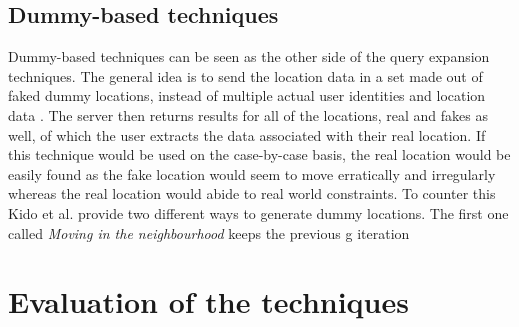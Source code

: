 \documentclass[english]{tktltiki2}
\theoremstyle{definition}
\theoremstyle{remark}
\begin{document}
\subsection{Dummy-based techniques}

Dummy-based techniques can be seen as the other side of the query expansion techniques. The general idea is to send the location data in a set made out of faked dummy locations, instead of multiple actual user identities and location data \cite{Kido2005}. The server then returns results for all of the locations, real and fakes as well, of which the user extracts the data associated with their real location. If this technique would be used on the case-by-case basis, the real location would be easily found as the fake location would seem to move erratically and irregularly whereas the real location would abide to real world constraints. To counter this Kido et al. provide two different ways to generate dummy locations. The first one called \textit{Moving in the neighbourhood} keeps the previous g iteration  

\section{Evaluation of the techniques}


%
%
% 
%







% 
\end{document}
